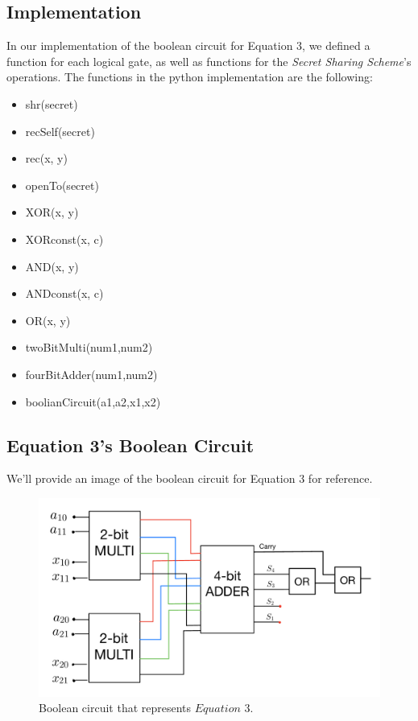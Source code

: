 \documentclass{article}
\begin{document}
\subsection{Implementation}
In our implementation of the boolean circuit for Equation 3, we defined a function for each logical gate, as well as functions for the \textit{Secret Sharing Scheme}'s operations. The functions in the python implementation are the following:

\begin{itemize}
  \item shr(secret)
  \item recSelf(secret)
  \item rec(x, y)
  \item openTo(secret)
  \item XOR(x, y)
  \item XORconst(x, c)
  \item AND(x, y)
  \item ANDconst(x, c)
  \item OR(x, y)
  \item twoBitMulti(num1,num2)
  \item fourBitAdder(num1,num2)
  \item boolianCircuit(a1,a2,x1,x2)
\end{itemize}
\newpage
\subsection{Equation 3's Boolean Circuit}
We'll provide an image of the boolean circuit for Equation 3 for reference.
\begin{figure}[H]
    \centering
    \includegraphics[width=1\linewidth]{FinalBooleanCircuit.jpeg}
    \caption{Boolean circuit that represents $Equation$ $3$.}
    \label{fig:enter-label}
\end{figure}
\end{document}
